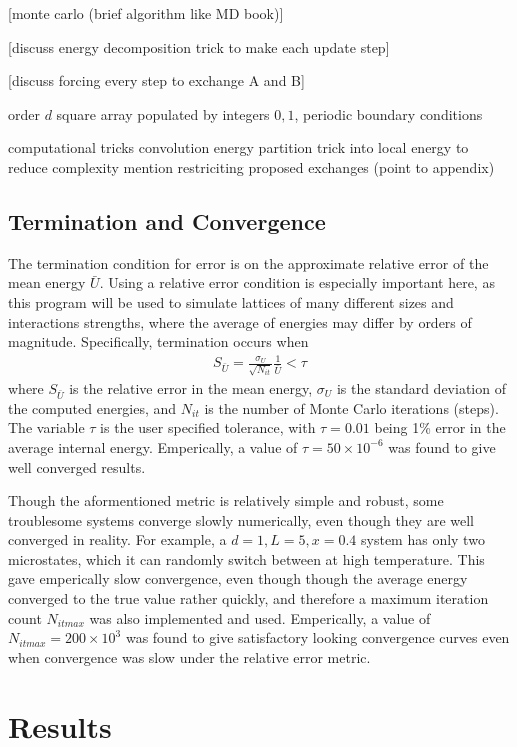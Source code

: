 \documentclass[10pt]{article}
\begin{document}
[monte carlo (brief algorithm like MD book)]

[discuss energy decomposition trick to make each update step]

[discuss forcing every step to exchange A and B]

order $d$ square array populated by integers $0, 1$, periodic boundary conditions


computational tricks
    convolution
    energy partition trick into local energy to reduce complexity
    mention restriciting proposed exchanges (point to appendix)


\subsection{Termination and Convergence}
The termination condition for error is on the approximate relative error of the mean energy $\bar{U}$.
Using a relative error condition is especially important here, as this program will be used to simulate lattices of many different sizes and interactions strengths, where the average of energies may differ by orders of magnitude.
Specifically, termination occurs when
\begin{align}
    S_{\bar{U}} =
    \frac{\sigma_{U}}{\sqrt{N_{it}}} \frac{1}{\bar{U}}
    < \tau
\end{align}
where $S_{\bar{U}}$ is the relative error in the mean energy, $\sigma_{U}$ is the standard deviation of the computed energies, and $N_{it}$ is the number of Monte Carlo iterations (steps).
The variable $\tau$ is the user specified tolerance, with $\tau = 0.01$ being 1\% error in the average internal energy.
Emperically, a value of $\tau = 50 \times 10^{-6}$ was found to give well converged results.

Though the aformentioned metric is relatively simple and robust, some troublesome systems converge slowly numerically, even though they are well converged in reality.
For example, a $d=1, L=5, x=0.4$ system has only two microstates, which it can randomly switch between at high temperature.
This gave emperically slow convergence, even though though the average energy converged to the true value rather quickly, and therefore a maximum iteration count $N_{it max}$ was also implemented and used.
Emperically, a value of $N_{it max} = 200 \times 10^3$ was found to give satisfactory looking convergence curves even when convergence was slow under the relative error metric.


\section{Results}
\end{document}
